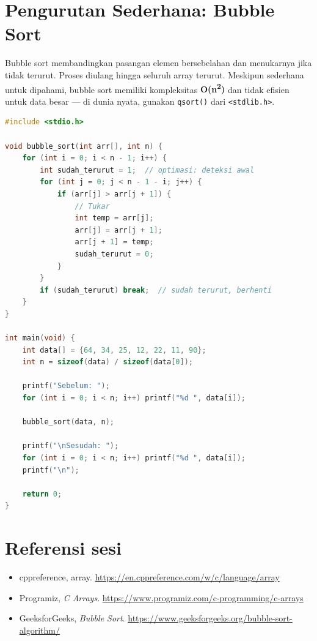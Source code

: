 \documentclass[../main.tex]{subfiles}
\begin{document}
\section{Pengurutan Sederhana: Bubble Sort}

Bubble sort membandingkan pasangan elemen bersebelahan dan menukarnya jika tidak terurut. Proses diulang hingga seluruh array terurut. Meskipun sederhana untuk dipahami, bubble sort memiliki kompleksitas \textbf{O(n\textsuperscript{2})} dan tidak efisien untuk data besar --- di dunia nyata, gunakan \texttt{qsort()} dari \texttt{<stdlib.h>}.

\begin{lstlisting}[language=C,caption=Bubble sort ascending]
#include <stdio.h>

void bubble_sort(int arr[], int n) {
    for (int i = 0; i < n - 1; i++) {
        int sudah_terurut = 1;  // optimasi: deteksi awal
        for (int j = 0; j < n - 1 - i; j++) {
            if (arr[j] > arr[j + 1]) {
                // Tukar
                int temp = arr[j];
                arr[j] = arr[j + 1];
                arr[j + 1] = temp;
                sudah_terurut = 0;
            }
        }
        if (sudah_terurut) break;  // sudah terurut, berhenti
    }
}

int main(void) {
    int data[] = {64, 34, 25, 12, 22, 11, 90};
    int n = sizeof(data) / sizeof(data[0]);
    
    printf("Sebelum: ");
    for (int i = 0; i < n; i++) printf("%d ", data[i]);
    
    bubble_sort(data, n);
    
    printf("\nSesudah: ");
    for (int i = 0; i < n; i++) printf("%d ", data[i]);
    printf("\n");
    
    return 0;
}
\end{lstlisting}

\section{Referensi sesi}
\begin{itemize}[leftmargin=*]
  \item cppreference, array. \url{https://en.cppreference.com/w/c/language/array}
  \item Programiz, \textit{C Arrays}. \url{https://www.programiz.com/c-programming/c-arrays}
  \item GeeksforGeeks, \textit{Bubble Sort}. \url{https://www.geeksforgeeks.org/bubble-sort-algorithm/}
\end{itemize}
\end{document}
